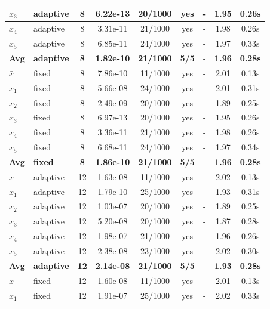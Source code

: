 \begin{longtable}{|l|l|c|c|c|c|c|c|c|}
\hline
$x_3$ & adaptive & 8 & 6.22e-13 & 20/1000 & yes & - & 1.95 & 0.26s \\
\hline
$x_4$ & adaptive & 8 & 3.31e-11 & 21/1000 & yes & - & 1.98 & 0.26s \\
\hline
$x_5$ & adaptive & 8 & 6.85e-11 & 24/1000 & yes & - & 1.97 & 0.33s \\
\hline
\hline\hline
\textbf{Avg} & \textbf{adaptive} & \textbf{8} & \textbf{1.82e-10} & \textbf{21/1000} & \textbf{5/5} & - & \textbf{1.96} & \textbf{0.28s} \\
\hline\hline
\hline
$\bar{x}$ & fixed & 8 & 7.86e-10 & 11/1000 & yes & - & 2.01 & 0.13s \\
\hline
$x_1$ & fixed & 8 & 5.66e-08 & 24/1000 & yes & - & 2.01 & 0.31s \\
\hline
$x_2$ & fixed & 8 & 2.49e-09 & 20/1000 & yes & - & 1.89 & 0.25s \\
\hline
$x_3$ & fixed & 8 & 6.97e-13 & 20/1000 & yes & - & 1.95 & 0.26s \\
\hline
$x_4$ & fixed & 8 & 3.36e-11 & 21/1000 & yes & - & 1.98 & 0.26s \\
\hline
$x_5$ & fixed & 8 & 6.68e-11 & 24/1000 & yes & - & 1.97 & 0.34s \\
\hline
\hline\hline
\textbf{Avg} & \textbf{fixed} & \textbf{8} & \textbf{1.86e-10} & \textbf{21/1000} & \textbf{5/5} & - & \textbf{1.96} & \textbf{0.28s} \\
\hline\hline
$\bar{x}$ & adaptive & 12 & 1.63e-08 & 11/1000 & yes & - & 2.02 & 0.13s \\
\hline
$x_1$ & adaptive & 12 & 1.79e-10 & 25/1000 & yes & - & 1.93 & 0.31s \\
\hline
$x_2$ & adaptive & 12 & 1.03e-07 & 20/1000 & yes & - & 1.89 & 0.25s \\
\hline
$x_3$ & adaptive & 12 & 5.20e-08 & 20/1000 & yes & - & 1.87 & 0.28s \\
\hline
$x_4$ & adaptive & 12 & 1.98e-07 & 21/1000 & yes & - & 1.96 & 0.26s \\
\hline
$x_5$ & adaptive & 12 & 2.38e-08 & 23/1000 & yes & - & 2.02 & 0.30s \\
\hline
\hline\hline
\textbf{Avg} & \textbf{adaptive} & \textbf{12} & \textbf{2.14e-08} & \textbf{21/1000} & \textbf{5/5} & - & \textbf{1.93} & \textbf{0.28s} \\
\hline\hline
\hline
$\bar{x}$ & fixed & 12 & 1.60e-08 & 11/1000 & yes & - & 2.01 & 0.13s \\
\hline
$x_1$ & fixed & 12 & 1.91e-07 & 25/1000 & yes & - & 2.02 & 0.33s \\

\end{longtable}
